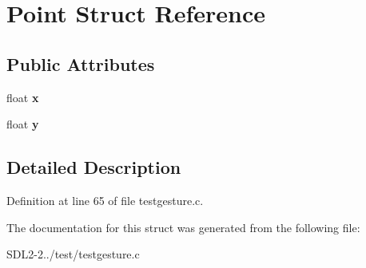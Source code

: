 \hypertarget{structPoint}{\section{Point Struct Reference}
\label{structPoint}
}
\subsection*{Public Attributes}
\begin{DoxyCompactItemize}
\item 
\hypertarget{structPoint_a05dfe2dfbde813ad234b514f30e662f1}{float {\bfseries x}}\label{structPoint_a05dfe2dfbde813ad234b514f30e662f1}

\item 
\hypertarget{structPoint_a6101960c8d2d4e8ea1d32c9234bbeb8d}{float {\bfseries y}}\label{structPoint_a6101960c8d2d4e8ea1d32c9234bbeb8d}

\end{DoxyCompactItemize}


\subsection{Detailed Description}


Definition at line 65 of file testgesture.\+c.



The documentation for this struct was generated from the following file\+:\begin{DoxyCompactItemize}
\item 
S\+D\+L2-\/2../test/testgesture.\+c\end{DoxyCompactItemize}
